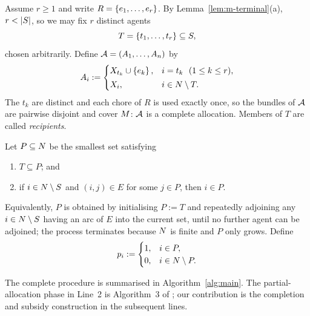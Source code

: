 Assume $r \ge 1$ and write $R = \left\{e_1,\dots,e_r\right\}$. By
Lemma~\ref{lem:m-terminal}(a), $r < \left\lvert S\right\rvert$, so we may fix $r$ distinct agents
\[
  T = \left\{t_1,\dots,t_r\right\} \subseteq S ,
\]
chosen arbitrarily. Define $\mathcal{A} = (A_1,\dots,A_n)$ by
\begin{equation}
\label{eq:m-alloc}
  A_i :=
  \begin{cases}
    X_{t_k} \cup \left\{e_k\right\}, & i = t_k \ \ (1 \le k \le r),\\[2pt]
    X_i, & i \in N \setminus T .
  \end{cases}
\end{equation}
The $t_k$ are distinct and each chore of $R$ is used exactly once, so the
bundles of $\mathcal{A}$ are pairwise disjoint and cover $M$: $\mathcal{A}$ is a
complete allocation. Members of $T$ are called \emph{recipients}.

\begin{definition}
\label{def:m-P}
Let $P \subseteq N$ be the smallest set satisfying
\begin{enumerate}
  \item[(P1)] $T \subseteq P$; and
  \item[(P2)] if $i \in N \setminus S$ and $(i,j) \in E$ for some
        $j \in P$, then $i \in P$.
\end{enumerate}
Equivalently, $P$ is obtained by initialising $P := T$ and repeatedly adjoining
any $i \in N \setminus S$ having an arc of $E$ into the current set,
until no further agent can be adjoined; the process terminates because
$N$ is finite and $P$ only grows. Define
\begin{equation}
\label{eq:m-subsidy}
  p_i := \begin{cases} 1, & i \in P,\\ 0, & i \in N \setminus P.\end{cases}
\end{equation}
\end{definition}

The complete procedure is summarised in
Algorithm~\ref{alg:main}. The partial-allocation phase in Line~2 is Algorithm~3 of
\cite{TWYZ23}; our contribution is the completion and subsidy construction in the subsequent lines.

